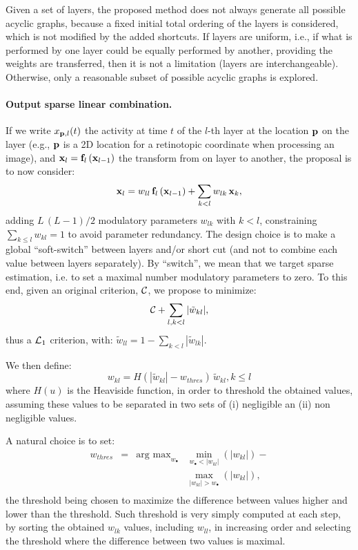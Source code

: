 \documentclass[twocolumn]{article}
\begin{document}
Given a set of layers, the proposed method does not always generate all possible acyclic graphs, because a fixed initial total ordering of the layers is considered, which is not modified by the added shortcuts. If layers are uniform, i.e., if what is performed by one layer could be equally performed by another, providing the weights are transferred, then it is not a limitation (layers are interchangeable). Otherwise, only a reasonable subset of possible acyclic graphs is explored.

\paragraph*{Output sparse linear combination.}

If we write $x_{{\bf p}, l}(t)$ the activity at time $t$ of the $l$-th layer at the location ${\bf p}$ on the layer (e.g., ${\bf p}$ is a 2D location for a retinotopic coordinate when processing an image), and ${\bf x}_l = {\bf f}_l\left({\bf x}_{l-1}\right)$ the transform from on layer to another, the proposal is to now consider: $${\bf x}_l = w_{ll} \, {\bf f}_l\left({\bf x}_{l-1}\right) + \sum_{k < l} w_{lk} \, {\bf x}_k,$$ adding $L\,(L-1)/2$ modulatory parameters $w_{lk}$ with $k < l$, constraining $\sum_{k \leq l} w_{kl} = 1$ to avoid parameter redundancy. 
The design choice is to make a global ``soft-switch'' between layers and/or short cut (and not to combine each value between layers separately). By ``switch'', we mean that we target sparse estimation, i.e. to set a maximal number modulatory parameters to zero.
To this end, given an original criterion, ${\cal C}$, we propose to minimize: $${\cal C} + \sum_{l,k<l} |\tilde{w}_{kl}|,$$ thus a ${\cal L}_1$ criterion, with: $\tilde{w}_{ll} = 1 - \sum_{k < l} |\tilde{w}_{lk}|$.

We then define: $$w_{kl} = H(|\tilde{w}_{kl}| - w_{thres})\, \tilde{w}_{kl}, k \leq l$$  where $H(u)$ is the Heaviside function, in order to threshold the obtained values, assuming these values to be separated in two sets of (i) negligible an (ii) non negligible values. 

A natural choice is to set: $$\begin{array}{rcll} w_{thres} &=& \mbox{arg max}_{w_\bullet} & \min_{w_\bullet < |w_{kl}|}(|w_{kl}|) - \\ &&& \max_{|w_{kl}|> w_\bullet}(|w_{kl}|),\\ \end{array}$$ the threshold being chosen to maximize the difference between values higher and lower than the threshold. Such threshold is very simply computed at each step, by sorting the obtained $w_{lk}$ values, including $w_{ll}$, in increasing order and selecting the threshold where the difference between two values is maximal.
\end{document}
